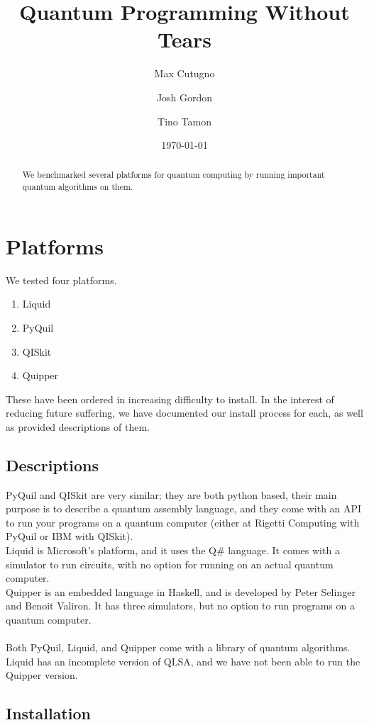 \documentclass[a4paper,10pt]{article}
\title{Quantum Programming Without Tears}
\author{
Max Cutugno 
\and
Josh Gordon
\and
Tino Tamon
}
\date{\today}
\begin{document}
\maketitle

\begin{abstract}
We benchmarked several platforms for quantum computing by running important quantum algorithms on them.
\end{abstract}

\tableofcontents

\section{Platforms}

We tested four platforms.
\begin{enumerate}
\item Liquid
\item PyQuil
\item QISkit
\item Quipper
\end{enumerate}
These have been ordered in increasing difficulty to install. In the interest of reducing future suffering, we have documented our install process for each, as well as provided descriptions of them.
\subsection{Descriptions}
PyQuil and QISkit are very similar; they are both python based, their main purpose is to describe a quantum assembly language, and they come with an API to run your programs on a quantum computer (either at Rigetti Computing with PyQuil or IBM with QISkit). \\
Liquid is Microsoft's platform, and it uses the Q\# language. It comes with a simulator to run circuits, with no option for running on an actual quantum computer. \\
Quipper is an embedded language in Haskell, and is developed by Peter Selinger and Benoit Valiron. It has three simulators, but no option to run programs on a quantum computer.\\
\\
Both PyQuil, Liquid, and Quipper come with a library of quantum algorithms. Liquid has an incomplete version of QLSA, and we have not been able to run the Quipper version.

\subsection{Installation}
\end{document}
